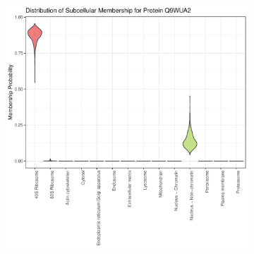 \documentclass[12pt,english]{article}\usepackage[]{graphicx}\usepackage[]{color}
\makeatletter
\def\maxwidth{ %
  \ifdim\Gin@nat@width>\linewidth
    \linewidth
  \else
    \Gin@nat@width
  \fi
}
\newenvironment{knitrout}{}{} %
\makeatother
\begin{document}
\begin{figure}[h]
  \centering
  \begin{subfigure}[t]{0.5\textwidth}
    \centering
\begin{knitrout}
\color{fgcolor}

{\centering \includegraphics[width=\maxwidth]{figure/Q9WUA2-prob-1} 

}



\end{knitrout}
    \caption{}
  \end{subfigure}%
  \begin{subfigure}[t]{0.5\textwidth}
    \centering
\begin{knitrout}
\color{fgcolor}


\end{knitrout}
\end{subfigure}
\end{figure}
\end{document}
